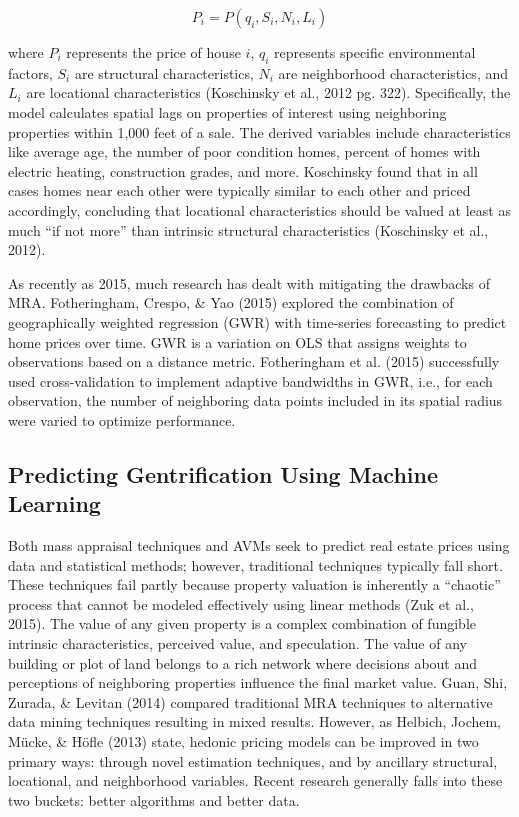 \documentclass[conference,final,]{IEEEtran}
\begin{document}
\[
P_i = P(q_i,S_i, N_i, L_i)
\]

\noindent where \(P_i\) represents the price of house \(i\), \(q_i\)
represents specific environmental factors, \(S_i\) are structural
characteristics, \(N_i\) are neighborhood characteristics, and \(L_i\)
are locational characteristics (Koschinsky et al., 2012 pg. 322).
Specifically, the model calculates spatial lags on properties of
interest using neighboring properties within 1,000 feet of a sale. The
derived variables include characteristics like average age, the number
of poor condition homes, percent of homes with electric heating,
construction grades, and more. Koschinsky found that in all cases homes
near each other were typically similar to each other and priced
accordingly, concluding that locational characteristics should be valued
at least as much ``if not more'' than intrinsic structural
characteristics (Koschinsky et al., 2012).

As recently as 2015, much research has dealt with mitigating the
drawbacks of MRA. Fotheringham, Crespo, \& Yao (2015) explored the
combination of geographically weighted regression (GWR) with time-series
forecasting to predict home prices over time. GWR is a variation on OLS
that assigns weights to observations based on a distance metric.
Fotheringham et al. (2015) successfully used cross-validation to
implement adaptive bandwidths in GWR, i.e., for each observation, the
number of neighboring data points included in its spatial radius were
varied to optimize performance.

\hypertarget{predicting-gentrification-using-machine-learning}{%
\subsection{Predicting Gentrification Using Machine
Learning}\label{predicting-gentrification-using-machine-learning}}

Both mass appraisal techniques and AVMs seek to predict real estate
prices using data and statistical methods; however, traditional
techniques typically fall short. These techniques fail partly because
property valuation is inherently a ``chaotic'' process that cannot be
modeled effectively using linear methods (Zuk et al., 2015). The value
of any given property is a complex combination of fungible intrinsic
characteristics, perceived value, and speculation. The value of any
building or plot of land belongs to a rich network where decisions about
and perceptions of neighboring properties influence the final market
value. Guan, Shi, Zurada, \& Levitan (2014) compared traditional MRA
techniques to alternative data mining techniques resulting in mixed
results. However, as Helbich, Jochem, Mücke, \& Höfle (2013) state,
hedonic pricing models can be improved in two primary ways: through
novel estimation techniques, and by ancillary structural, locational,
and neighborhood variables. Recent research generally falls into these
two buckets: better algorithms and better data.
\end{document}
